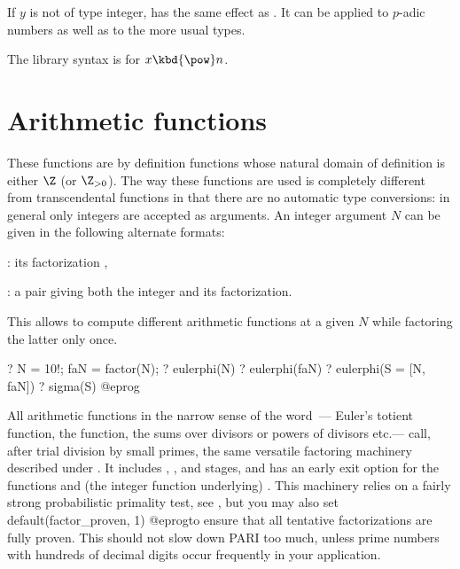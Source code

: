 \subseckbd{\pow} If $y$ is not of type integer,  has the same
effect as . It can be applied to $p$-adic numbers as well
as to the more usual types.

The library syntax is 
for $x\hbox{\kbd{\pow}}n$.


\section{Arithmetic functions}\label{se:arithmetic}

These functions are by definition functions whose natural domain of
definition is either $\Z$ (or $\Z_{>0}$). The way these functions are used is
completely different from transcendental functions in that there are no
automatic type conversions: in general only integers are accepted as
arguments. An integer argument $N$ can be given in the following alternate
formats:

\item {}: its factorization ,

\item {}: a pair \kbd{[$N$, fa]} giving both the integer and
  its factorization.

This allows to compute different arithmetic functions at a given $N$
while factoring the latter only once.

\bprog
  ? N = 10!; faN = factor(N);
  ? eulerphi(N)
  ? eulerphi(faN)
  ? eulerphi(S = [N, faN])
  ? sigma(S)
@eprog

All arithmetic functions in the narrow sense of the word~--- Euler's
totient function, the  function,
the sums over divisors or powers of divisors etc.--- call, after trial
division by small primes, the same versatile factoring machinery described
under . It includes , ,
 and  stages, and has an early exit option for the
functions  and (the integer function underlying)
. This machinery relies on a fairly strong
probabilistic primality test, see , but you may also set
\bprog
  default(factor_proven, 1)
@eprog\noindent to ensure that all tentative factorizations are fully proven.
This should not slow down PARI too much, unless prime numbers with
hundreds of decimal digits occur frequently in your application.

